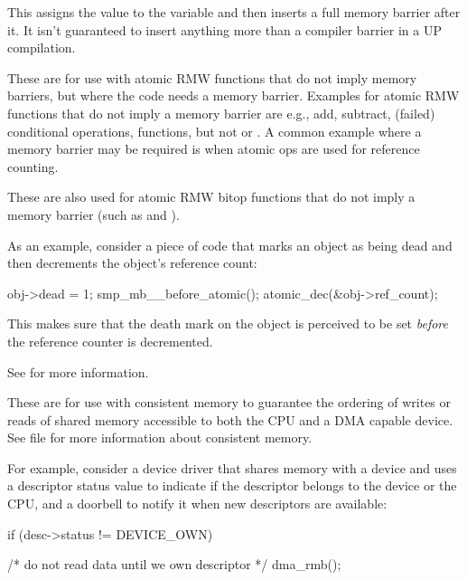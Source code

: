 \begin{description}[style=nextline]
 \item[\tco{smp_store_mb(var, value)}]
     This assigns the value to the variable and then inserts a full memory
     barrier after it.  It isn't guaranteed to insert anything more than a
     compiler barrier in a UP compilation.


 \item[\tco{smp_mb__before_atomic()} and \tco{smp_mb__after_atomic()}]
     These are for use with atomic RMW functions that do not imply memory
     barriers, but where the code needs a memory barrier.
     Examples for atomic RMW functions that do not imply a memory barrier
     are e.g., add, subtract, (failed) conditional operations,
      functions, but not  or .
     A common example where a memory barrier may be required is when
     atomic ops are used for reference counting.

     These are also used for atomic RMW bitop functions that do not imply a
     memory barrier (such as  and ).

     As an example, consider a piece of code that marks an object as being dead
     and then decrements the object's reference count:

\begin{VerbatimU}
	obj->dead = 1;
	smp_mb__before_atomic();
	atomic_dec(&obj->ref_count);
\end{VerbatimU}

     This makes sure that the death mark on the object is perceived to be set
     \emph{before} the reference counter is decremented.

     See  for more information.

   \item[\tco{dma_wmb()}, \tco{dma_rmb()}, and \tco{dma_mb()}]
     These are for use with consistent memory to guarantee the ordering
     of writes or reads of shared memory accessible to both the CPU and a
     DMA capable device.
     See  file for more
     information about consistent memory.

     For example, consider a device driver that shares memory with a device
     and uses a descriptor status value to indicate if the descriptor belongs
     to the device or the CPU, and a doorbell to notify it when new
     descriptors are available:

\begin{VerbatimU}
	if (desc->status != DEVICE_OWN) {
		/* do not read data until we own descriptor */
		dma_rmb();

}
\end{VerbatimU}
\end{description}
